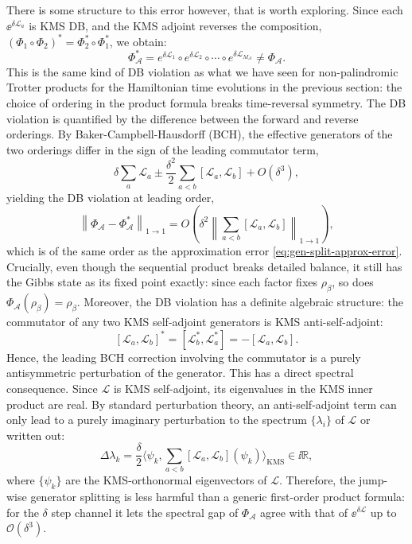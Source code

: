 There is some structure to this error however, that is worth exploring.
Since each $\ee^{\delta \mathcal{L}_a}$ is KMS DB, and the KMS adjoint reverses the composition, $({\Phi_1 \circ \Phi_2})^* = \Phi_2^* \circ \Phi_1^*$, we obtain: 
\begin{equation}
    \Phi_{\mathcal{A}}^* = e^{\delta \mathcal{L}_1} \circ e^{\delta \mathcal{L}_2} \circ \cdots \circ e^{\delta \mathcal{L}_{M_\mathcal{A}}} \neq \Phi_{\mathcal{A}}.
\end{equation}
This is the same kind of DB violation as what we have seen for non-palindromic Trotter products for the Hamiltonian time evolutions in the previous section: the choice of ordering in the product formula breaks time-reversal symmetry. The DB violation is quantified by the difference between the forward and reverse orderings. By Baker-Campbell-Hausdorff (BCH), the effective generators of the two orderings differ in the sign of the leading commutator term, 
$$
\delta \sum_a \mathcal{L}_a \pm \frac{\delta^2}{2}\sum_{a < b}[\mathcal{L}_a, \mathcal{L}_b] + O(\delta^3),
$$
yielding the DB violation at leading order, 
\begin{equation}
    \left\|\Phi_{\mathcal{A}} - \Phi_{\mathcal{A}}^*\right\|_{1\to 1} = O\!\left(\delta^2 \left\|\sum_{a<b}[\mathcal{L}_a, \mathcal{L}_b]\right\|_{1\to 1}\right),
\end{equation}
which is of the same order as the approximation error \eqref{eq:gen-split-approx-error}. Crucially, even though the sequential product breaks detailed balance, it still has the Gibbs state as its fixed point exactly: since each factor fixes $\rho_\beta$, so does $\Phi_{\mathcal{A}}(\rho_\beta) = \rho_\beta$. Moreover, the DB violation has a definite algebraic structure: the commutator of any two KMS self-adjoint generators is KMS anti-self-adjoint: 
$$
[\mathcal{L}_a, \mathcal{L}_b]^* = [\mathcal{L}_b^*, \mathcal{L}_a^*] = -[\mathcal{L}_a, \mathcal{L}_b].
$$
Hence, the leading BCH correction involving the commutator is a purely antisymmetric perturbation of the generator. This has a direct spectral consequence. Since $\mathcal{L}$ is KMS self-adjoint, its eigenvalues in the KMS inner product are real. By standard perturbation theory, an anti-self-adjoint term can only lead to a purely imaginary perturbation to the spectrum $\{\lambda_i\}$ of $\mathcal{L}$ or written out:
\begin{equation} \label{eq:gen-split-imaginary-delta2-errors}
    \Delta\lambda_k = \frac{\delta}{2}\langle \psi_k, \sum_{a<b}[\mathcal{L}_a, \mathcal{L}_b](\psi_k) \rangle_{\mathrm{KMS}} \in \ii\mathbb{R},
\end{equation}
where $\{\psi_k\}$ are the KMS-orthonormal eigenvectors of $\mathcal{L}$. Therefore, the jump-wise generator splitting is less harmful than a generic first-order product formula: for the $\delta$ step channel it lets the spectral gap of $\Phi_\mathcal{A}$ agree with that of $\ee^{\delta \mathcal{L}}$ up to $\mathcal{O}(\delta^3)$.

